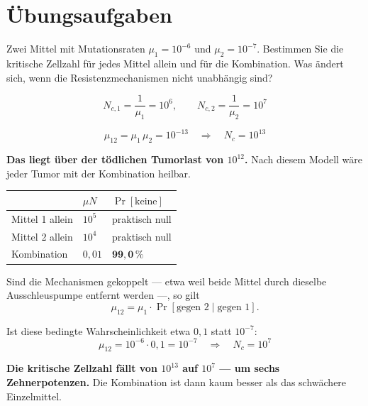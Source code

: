 \section{Übungsaufgaben}

\begin{aufgabe}
Zwei Mittel mit Mutationsraten $\mu_1 = 10^{-6}$ und $\mu_2 = 10^{-7}$. Bestimmen Sie die kritische Zellzahl für jedes Mittel allein und für die Kombination. Was ändert sich, wenn die Resistenzmechanismen nicht unabhängig sind?

\loesung
{}
\[ N_{c,1} = \frac{1}{\mu_1} = 10^{6}, \qquad N_{c,2} = \frac{1}{\mu_2} = 10^{7} \]

\[ \mu_{12} = \mu_1\,\mu_2 = 10^{-13} \quad\Longrightarrow\quad N_c = 10^{13} \]

\begin{center}
\begin{minipage}{0.9\textwidth}
\textbf{Das liegt über der tödlichen Tumorlast von $10^{12}$.} Nach diesem Modell wäre jeder Tumor mit der Kombination heilbar.
\end{minipage}
\end{center}

\begin{center}
\renewcommand{\arraystretch}{1.48}
\begin{tabular}{@{}P{2.6cm}P{2.2cm}P{2.8cm}@{}}
\toprule
& $\mu N$ & $\Pr[\text{keine}]$\\
\midrule
Mittel 1 allein & $10^{5}$ & praktisch null\\
Mittel 2 allein & $10^{4}$ & praktisch null\\
Kombination & $0{,}01$ & $\mathbf{99{,}0\,\%}$\\
\bottomrule
\end{tabular}
\end{center}

Sind die Mechanismen gekoppelt --- etwa weil beide Mittel durch dieselbe Ausschleuspumpe entfernt werden ---, so gilt
\[ \mu_{12} = \mu_1 \cdot \Pr[\text{gegen 2} \mid \text{gegen 1}] . \]

Ist diese bedingte Wahrscheinlichkeit etwa $0{,}1$ statt $10^{-7}$:
\[ \mu_{12} = 10^{-6} \cdot 0{,}1 = 10^{-7} \quad\Longrightarrow\quad N_c = 10^{7} \]

\begin{center}
\begin{minipage}{0.9\textwidth}
\textbf{Die kritische Zellzahl fällt von $10^{13}$ auf $10^{7}$ --- um sechs Zehnerpotenzen.} Die Kombination ist dann kaum besser als das schwächere Einzelmittel.
\end{minipage}
\end{center}


\end{aufgabe}
